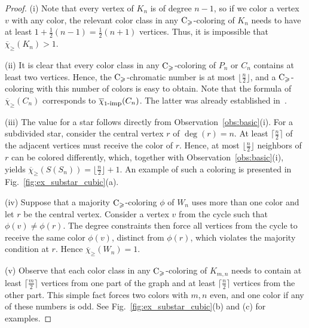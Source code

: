 \documentclass{article}
\theoremstyle{definition}
\newcommand{\mc}{\overline{\chi}_{\geqslant}}
\newcommand{\cg}{{\rm C}_{\geqslant}}
\newcommand{\hf}[1]{ \textcolor{orange}{HF: #1}}
\begin{document}
\begin{proof}
\noindent (i) Note that every vertex of $K_n$ is of degree $n-1$, so if we color a vertex $v$ with any color, the relevant color class in any $\cg$-coloring of $K_n$ needs to have at least $1+\frac{1}{2}(n-1)=\frac{1}{2}(n+1)$ vertices. Thus, it is impossible that $\mc(K_n)>1$.

\noindent (ii) It is clear that every color class in any $\cg$-coloring of $P_n$ or $C_n$ contains at least two vertices. Hence, the $\cg$-chromatic number is at most $\lfloor \frac{n}{2}\rfloor$, and a $\cg$-coloring with this number of colors is easy to obtain. Note that the formula of $\mc(C_n)$ corresponds to $\overline{\chi}_{1\mbox{\footnotesize{-imp}}}(C_n)$. The latter was already established in~\cite{BuSaTuPuVa-10}.



\noindent (iii) The value for a star follows directly from Observation~\ref{obs:basic}(i).  For a subdivided star, consider the central vertex $r$ of $\deg(r) = n$. At least $\lceil \frac{n}{2} \rceil$ of the adjacent vertices must receive the color of $r$. Hence, at most $\lfloor \frac{n}{2} \rfloor$ neighbors of $r$ can be colored differently, which, together with Observation~\ref{obs:basic}(i), yields $\mc(S(S_n))=\lfloor \frac{n}{2} \rfloor+1.$
An example of such a coloring is presented in Fig.~\ref{fig:ex_substar_cubic}(a).


\noindent (iv) Suppose that a majority $\cg$-coloring $\phi$ of $W_n$ uses more than one color and let $r$ be the central vertex. Consider a vertex $v$ from the cycle such that $\phi(v) \neq \phi(r)$. 
The degree constraints then force all vertices from the cycle to receive the same color $\phi(v)$, distinct from $\phi(r)$, which violates the majority condition at $r$. Hence $\mc(W_n)=1$.

\noindent (v) Observe that each color class in any $\cg$-coloring of $K_{m,n}$ needs to contain at least $\lceil\frac{m}{2}\rceil$ vertices from one part of the graph and at least $\lceil\frac{n}{2}\rceil$ vertices from the other part. This simple fact forces two colors with $m,n$ even, and one color if any of these numbers is odd. See Fig.\ \ref{fig:ex_substar_cubic}(b) and (c) for examples.   \end{proof}
\end{document}
